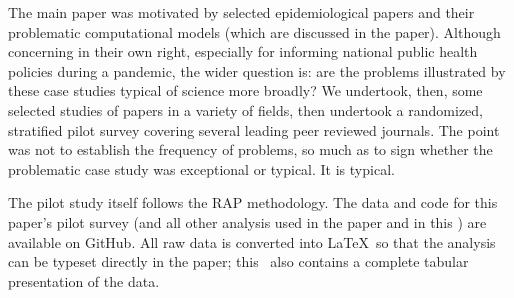 \documentclass[10pt,a4paper]{article}
\begin{document}
The main paper was motivated by selected epidemiological papers and their problematic computational models (which are discussed in the paper). Although concerning in their own right, especially for informing national public health policies during a pandemic, the wider question is: are the problems illustrated by these case studies typical of science more broadly? We undertook, then, some selected studies of papers in a variety of fields, then undertook a randomized, stratified pilot survey covering several leading peer reviewed journals. The point was not to establish the frequency of problems, so much as to sign whether the problematic case study was exceptional or typical. It is typical.




The pilot study itself follows the RAP methodology. The data and code for this paper's pilot survey (and all other analysis used in the paper and in this \supplement) are available on GitHub. All raw data is converted into \LaTeX\ so that the analysis can be typeset directly in the paper; this \supplement\ also contains a complete tabular presentation of the data.
\end{document}
